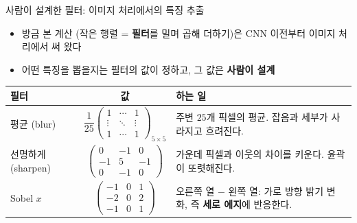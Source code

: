 \documentclass[aspectratio=169,11pt]{beamer}
\begin{document}
\begin{frame}{사람이 설계한 필터: 이미지 처리에서의 특징 추출}
\small
\begin{itemize}
\item 방금 본 계산 (작은 행렬 = \textbf{필터}를 밀며 곱해 더하기)은 CNN 이전부터 이미지 처리에서 써 왔다
\item 어떤 특징을 뽑을지는 필터의 값이 정하고, 그 값은 \textbf{사람이 설계}
\end{itemize}
\vskip2mm
\centering
\footnotesize\renewcommand{\arraystretch}{1.1}
\begin{tabular}{@{}l c p{}@{}}
\toprule
필터 & 값 & 하는 일 \\
\midrule
평균 (blur) & $\dfrac{1}{25}\begin{pmatrix}1&\cdots&1\\ \vdots&\ddots&\vdots\\ 1&\cdots&1\end{pmatrix}_{5\times5}$
& 주변 $25$개 픽셀의 평균. 잡음과 세부가 사라지고 흐려진다. \\[4pt]
선명하게 (sharpen) & $\begin{pmatrix}0&-1&0\\-1&5&-1\\0&-1&0\end{pmatrix}$
& 가운데 픽셀과 이웃의 차이를 키운다. 윤곽이 또렷해진다. \\[4pt]
Sobel $x$ & $\begin{pmatrix}-1&0&1\\-2&0&2\\-1&0&1\end{pmatrix}$
& 오른쪽 열 $-$ 왼쪽 열: 가로 방향 밝기 변화, 즉 \textbf{세로 에지}에 반응한다. \\
\bottomrule
\end{tabular}
\end{frame}
\end{document}
